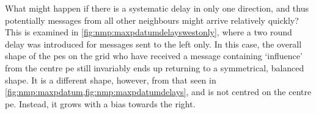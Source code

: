 What might happen if there is a systematic delay in only one direction, and thus potentially messages from all other neighbours might arrive relatively quickly?  This is examined in \cref{fig:nmp:maxpdatumdelayswestonly}, where a two round delay was introduced for messages sent to the left only.  In this case, the overall shape of the \glspl{pe} on the grid who have received a message containing `influence' from the centre \gls{pe} still invariably ends up returning to a symmetrical, balanced shape.  It is a different shape, however, from that seen in \cref{fig:nmp:maxpdatum,fig:nmp:maxpdatumdelays}, and is not centred on the centre \gls{pe}.  Instead, it grows with a bias towards the right.%


